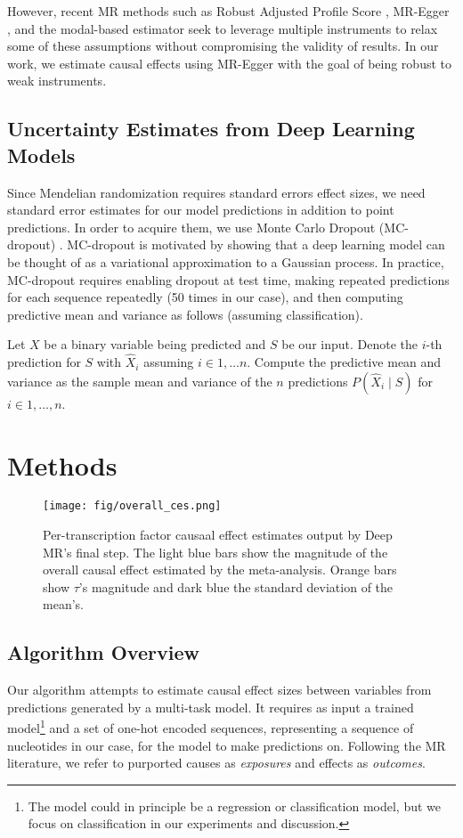 \documentclass{article}
\begin{document}
However, recent MR methods such as Robust Adjusted Profile Score \cite{zhao2018statistical}, MR-Egger \cite{bowden2015mendelian}, and the modal-based estimator \cite{burgess2018modal} seek to leverage multiple instruments to relax some of these assumptions without compromising the validity of results. In our work, we estimate causal effects using MR-Egger with the goal of being robust to weak instruments.

\subsection{Uncertainty Estimates from Deep Learning Models}
\label{sec:dl_uncertainty}
Since Mendelian randomization requires standard errors effect sizes, we need standard error estimates for our model predictions in addition to point predictions. In order to acquire them, we use Monte Carlo Dropout (MC-dropout) \citet{gal2016dropout}. MC-dropout is motivated by showing that a deep learning model can be thought of as a variational approximation to a Gaussian process. In practice, MC-dropout requires enabling dropout at test time, making repeated predictions for each sequence repeatedly (50 times in our case), and then computing predictive mean and variance as follows (assuming classification). 

Let $ X $ be a binary variable being predicted and $ S $ be our input. Denote the $ i $-th prediction for $ S $ with $ \hat{X}_i $ assuming $ i \in 1, \dots n $. Compute the predictive mean and variance as the sample mean and variance of the $ n $ predictions $ P(\hat{X}_i \mid S) $ for $ i \in 1, \dots, n $.

\section{Methods}
\begin{figure*}[ht]
    \centering
    \texttt{[image: fig/overall\_ces.png]}
    \caption{Per-transcription factor causaal effect estimates output by Deep MR's final step. The light blue bars show the magnitude of the overall causal effect estimated by the meta-analysis. Orange bars show \( \tau \)'s magnitude and dark blue the standard deviation of the mean's.}
    \label{fig:overall_ces}
\end{figure*}
\subsection{Algorithm Overview}
\label{sec:algo_overview}
Our algorithm attempts to estimate causal effect sizes between variables from predictions generated by a multi-task model. It requires as input a trained model\footnote{The model could in principle be a regression or classification model, but we focus on classification in our experiments and discussion.} and a set of one-hot encoded sequences, representing a sequence of nucleotides in our case, for the model to make predictions on. Following the MR literature, we refer to purported causes as \textit{exposures} and effects as \textit{outcomes}.
\end{document}

